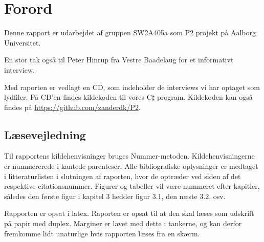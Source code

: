 \chapter*{Forord}
Denne rapport er udarbejdet af gruppen SW2A405a som P2 projekt på Aalborg Universitet.


En stor tak også til Peter Hinrup fra Vestre Baadelaug for et informativt interview.

Med raporten er vedlagt en CD, som indeholder de interviews vi har optaget som lydfiler. På CD'en findes kildekoden til vores C$\sharp$ program. Kildekoden kan også findes på \url{https://github.com/zanderdk/P2}.


\section{Læsevejledning}
Til rapportens kildehenvisninger bruges Nummer-metoden. Kildehenvisningerne er nummererede i kantede parenteser. Alle bibliografiske oplysninger er medtaget i litteraturlisten i slutningen af raporten, hvor de optræder ved siden af det respektive citationsnummer. Figurer og tabeller vil være nummeret efter kapitler, således den første figur i kapitel 3 hedder figur 3.1, den næste 3.2, osv.

Rapporten er opsat i latex. Raporten er opsat til at den skal læses som udskrift på papir med duplex. Marginer er lavet med dette i tankerne, og kan derfor fremkomme lidt unaturlige hvis rapporten læses fra en skærm.
